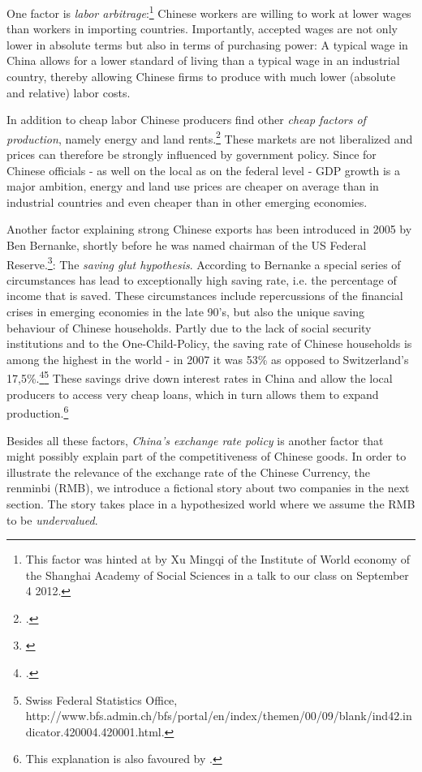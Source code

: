 \documentclass[11pt]{article}
\begin{document}
One factor is \emph{labor arbitrage}:\footnote{This factor was hinted at by Xu Mingqi of the Institute of World economy of the Shanghai Academy of Social Sciences in a talk to our class on September 4 2012.} Chinese workers are willing to work at lower wages than workers in importing countries. Importantly, accepted wages are not only lower in absolute terms but also in terms of purchasing power: A typical wage in China allows for a lower standard of living than a typical wage in an industrial country, thereby allowing Chinese firms to produce with much lower (absolute and relative) labor costs. 

In addition to cheap labor Chinese producers find other \emph{cheap factors of production}, namely energy and land rents.\footnote{\cite[pp. 25]{Huang2010}.} These markets are not liberalized and prices can therefore be strongly influenced by government policy. Since for Chinese officials - as well on the local as on the federal level - GDP growth is a major ambition, energy and land use prices are cheaper on average than in industrial countries and even cheaper than in other emerging economies.

Another factor explaining strong Chinese exports has been introduced in 2005 by Ben Bernanke, shortly before he was named chairman of the US Federal Reserve.\footnote{\cite{Bernanke2005}}: The \emph{saving glut hypothesis}. According to Bernanke a special series of circumstances has lead to exceptionally high saving rate, i.e. the percentage of income that is saved. These circumstances include repercussions of the financial crises in emerging economies in the late 90's, but also the unique saving behaviour of Chinese households. Partly due to the lack of social security institutions and to the One-Child-Policy, the saving rate of Chinese households is among the highest in the world - in 2007 it was 53\% as opposed to Switzerland's 17,5\%.\footnote{\cite[pp. 20]{Taoyang2011}.}\footnote{Swiss Federal Statistics Office, http://www.bfs.admin.ch/bfs/portal/en/index/themen/00/09/blank/ind42.indicator.420004.420001.html.} These savings drive down interest rates in China and allow the local producers to access very cheap loans, which in turn allows them to expand production.\footnote{This explanation is also favoured by \cite[pp. 41]{Wyplosz2010}.}

Besides all these factors, \emph{China's exchange rate policy} is another factor that might possibly explain part of the competitiveness of Chinese goods. In order to illustrate the relevance of the exchange rate of the Chinese Currency, the renminbi (RMB), we introduce a fictional story about two companies in the next section. The story takes place in a hypothesized world where we assume the RMB to be \emph{undervalued}. 
\end{document}
